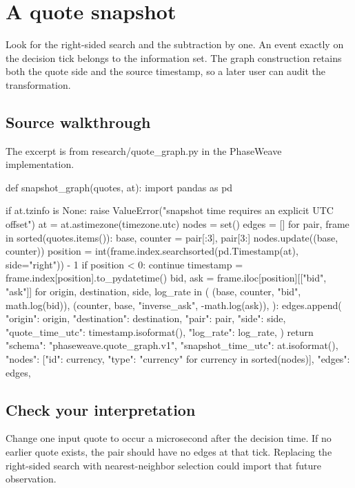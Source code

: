 \documentclass[11pt,oneside,openany]{book}
\begin{document}
\chapter{A quote snapshot}
Look for the right-sided search and the subtraction by one. An event exactly on the decision tick belongs to the information set. The graph construction retains both the quote side and the source timestamp, so a later user can audit the transformation.

\section*{Source walkthrough}
The excerpt is from research/quote\_graph.py in the PhaseWeave implementation.

\begin{BookCode}
def snapshot_graph(quotes, at):
    import pandas as pd

    if at.tzinfo is None:
        raise ValueError("snapshot time requires an explicit UTC offset")
    at = at.astimezone(timezone.utc)
    nodes = set()
    edges = []
    for pair, frame in sorted(quotes.items()):
        base, counter = pair[:3], pair[3:]
        nodes.update((base, counter))
        position = int(frame.index.searchsorted(pd.Timestamp(at), side="right")) - 1
        if position < 0:
            continue
        timestamp = frame.index[position].to_pydatetime()
        bid, ask = frame.iloc[position][["bid", "ask"]]
        for origin, destination, side, log_rate in (
            (base, counter, "bid", math.log(bid)),
            (counter, base, "inverse_ask", -math.log(ask)),
        ):
            edges.append({
                "origin": origin, "destination": destination, "pair": pair,
                "side": side, "quote_time_utc": timestamp.isoformat(),
                "log_rate": log_rate,
            })
    return {
        "schema": "phaseweave.quote_graph.v1",
        "snapshot_time_utc": at.isoformat(),
        "nodes": [{"id": currency, "type": "currency"} for currency in sorted(nodes)],
        "edges": edges,
    }
\end{BookCode}
\section*{Check your interpretation}
Change one input quote to occur a microsecond after the decision time. If no earlier quote exists, the pair should have no edges at that tick. Replacing the right-sided search with nearest-neighbor selection could import that future observation.
\end{document}
